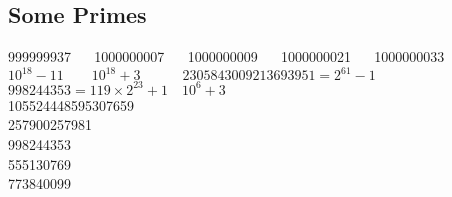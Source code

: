 \subsection{Some Primes}

999999937 $\quad$ 1000000007 $\quad$ 1000000009 $\quad$ 1000000021 $\quad$ 1000000033
$10^{18} - 11 \quad\quad 10^{18} + 3 \quad\quad\quad 2305843009213693951 = 2^{61} - 1$ \\
$998244353 = 119 \times 2^{23} + 1 \quad 10^6+3$ \\
105524448595307659   \\
257900257981    \\
998244353     \\
555130769     \\
773840099     \\